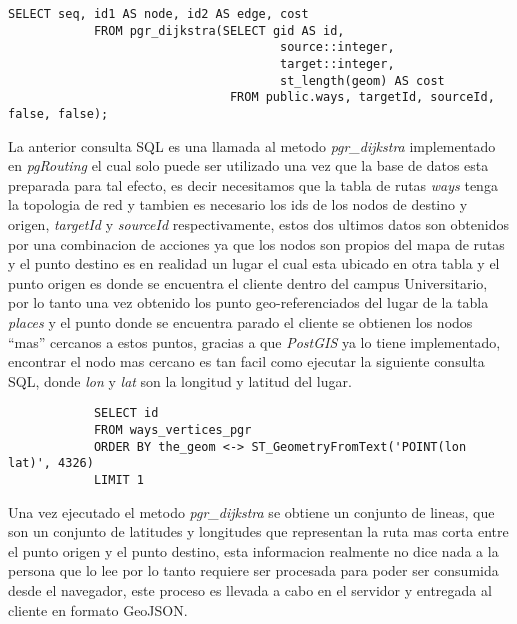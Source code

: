         \begin{center}
          \begin{lstlisting}[label=pgr_dijkstra,caption=Algoritmo de Dijkstra implementado en \emph{pgRouting}]
            SELECT seq, id1 AS node, id2 AS edge, cost
            FROM pgr_dijkstra(SELECT gid AS id,
                                      source::integer,
                                      target::integer,
                                      st_length(geom) AS cost
                               FROM public.ways, targetId, sourceId, false, false);
          \end{lstlisting}
        \end{center}


        La anterior consulta SQL es una llamada al metodo \emph{pgr\_dijkstra} implementado en \emph{pgRouting} el cual solo puede ser utilizado una vez que la base de datos esta preparada para tal efecto, es decir necesitamos que la tabla de rutas \emph{ways} tenga la topologia de red y tambien es necesario los ids de los nodos de destino y origen, \emph{targetId} y \emph{sourceId} respectivamente, estos dos ultimos datos son obtenidos por una combinacion de acciones ya que los nodos son propios del mapa de rutas y el punto destino es en realidad un lugar el cual esta ubicado en otra tabla y el punto origen es donde se encuentra el cliente dentro del campus Universitario, por lo tanto una vez obtenido los punto geo-referenciados del lugar de la tabla \emph{places} y el punto donde se encuentra parado el cliente se obtienen los nodos ``mas'' cercanos a estos puntos, gracias a que \emph{PostGIS} ya lo tiene implementado, encontrar el nodo mas cercano es tan facil como ejecutar la siguiente consulta SQL, donde \emph{lon} y \emph{lat} son la longitud y latitud del lugar.

        \begin{verbatim}
            SELECT id
            FROM ways_vertices_pgr
            ORDER BY the_geom <-> ST_GeometryFromText('POINT(lon lat)', 4326)
            LIMIT 1
        \end{verbatim}

        Una vez ejecutado el metodo \emph{pgr\_dijkstra} se obtiene un conjunto de lineas, que son un conjunto de latitudes y longitudes que representan la ruta mas corta entre el punto origen y el punto destino, esta informacion realmente no dice nada a la persona que lo lee por lo tanto requiere ser procesada para poder ser consumida desde el navegador, este proceso es llevada a cabo en el servidor y entregada al cliente en formato GeoJSON.\\


